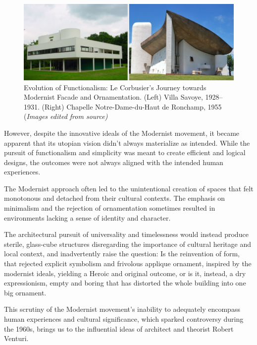      \begin{figure}[htb]
          \centering
          \includegraphics[width= \linewidth]{Images/ModernistFacade}
          \caption{Evolution of Functionalism: Le Corbusier's Journey towards Modernist Facade and Ornamentation. (Left) Villa Savoye, 1928--1931. (Right) Chapelle Notre-Dame-du-Haut de Ronchamp, 1955 (\textit{Images edited from source)}}
          \label{fig:Modernistfacade}
        \end{figure}


However, despite the innovative ideals of the Modernist movement,  it became apparent that its utopian vision didn't always materialize as intended.
While the pursuit of functionalism and simplicity was meant to create efficient and logical designs, the outcomes were not always aligned with the intended human experiences.

The Modernist approach often led to the unintentional creation of spaces that felt monotonous and detached from their cultural contexts.
The emphasis on minimalism and the rejection of ornamentation sometimes resulted in environments lacking a sense of identity and character.

The architectural pursuit of universality and timelessness would instead produce sterile, glass-cube structures\cite{Schudel2018} disregarding the importance of cultural heritage and local context, and inadvertently raise the question: Is the reinvention of form, that rejected explicit symbolism and frivolous applique ornament, inspired by the modernist ideals, yielding a Heroic and original outcome, or is it, instead, a dry expressionism, empty and boring that has distorted the whole building into one big ornament\cite{Venturi1971}.

This scrutiny of the Modernist movement's inability to adequately encompass human experiences and cultural significance, which sparked controversy during the 1960s, brings us to the influential ideas of architect and theorist Robert Venturi.


